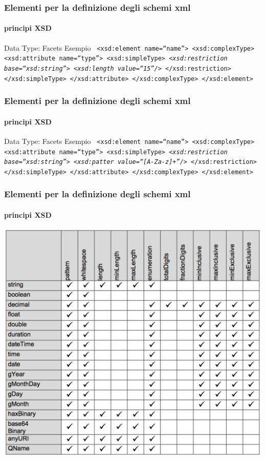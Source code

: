\begin{frame}
	\frametitle{Elementi per la definizione degli schemi xml}
	\framesubtitle{principi XSD}
	\addtocounter{nframe}{1}

	\begin{block}{Data Type: Facets Esempio}
		\texttt{
			<xsd:element name=``name''>
			<xsd:complexType>
			<xsd:attribute name=``type''>
			<xsd:simpleType>
			\emph{<xsd:restriction base=``xsd:string''>}
			\emph{<xsd:length value=``15''/>}
			</xsd:restriction>
			</xsd:simpleType>
			</xsd:attribute>
			</xsd:complexType>
			</xsd:element>
		}

	\end{block}

\end{frame}

\begin{frame}
	\frametitle{Elementi per la definizione degli schemi xml}
	\framesubtitle{principi XSD}
	\addtocounter{nframe}{1}

	\begin{block}{Data Type: Facets Esempio}
		\texttt{
		<xsd:element name=``name''>
		<xsd:complexType>
		<xsd:attribute name=``type''>
		<xsd:simpleType>
		\emph{<xsd:restriction base=``xsd:string''>}
		\emph{<xsd:patter value=``[A-Za-z]+''/>}
		</xsd:restriction>
		</xsd:simpleType>
		</xsd:attribute>
		</xsd:complexType>
		</xsd:element>
		}

	\end{block}

\end{frame}

\begin{frame}
	\frametitle{Elementi per la definizione degli schemi xml}
	\framesubtitle{principi XSD}
	\addtocounter{nframe}{1}

	\begin{center}
		\includegraphics[width=.8\textwidth]{imgs/SchemaDataTypeFacets.png}
	\end{center}

\end{frame}



